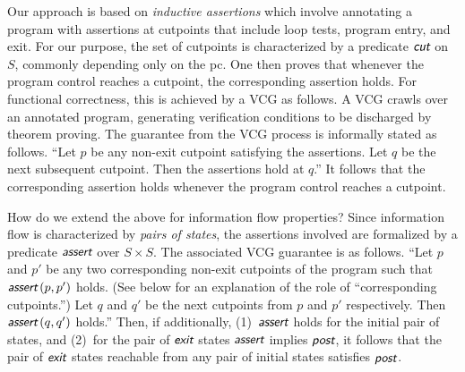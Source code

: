 \documentclass[conference]{IEEEtran}
\newcommand{\func}[1]{\ensuremath{\mbox{{\sf {\em #1}}}}}
\begin{document}
Our approach is based on {\em inductive assertions} which involve
annotating a program with assertions at cutpoints that include loop
tests, program entry, and exit.  For our purpose, the set of cutpoints
is characterized by a predicate \func{cut} on $S$, commonly depending
only on the pc.  One then proves that whenever the program control
reaches a cutpoint, the corresponding assertion holds.  For functional
correctness, this is achieved by a VCG as follows.  A VCG crawls over
an annotated program, generating verification conditions to be
discharged by theorem proving.  The guarantee from the VCG process is
informally stated as follows.  ``Let $p$ be any non-exit cutpoint
satisfying the assertions.  Let $q$ be the next subsequent cutpoint.
Then the assertions hold at $q$.''  It follows that the corresponding
assertion holds whenever the program control reaches a cutpoint.

How do we extend the above for information flow properties?  Since
information flow is characterized by {\em pairs of states}, the
assertions involved are formalized by a predicate $\func{assert}$ over
$S\times S$.  The associated VCG guarantee is as follows.  ``Let $p$
and $p'$ be any two corresponding non-exit cutpoints of the program
such that $\func{assert}\,(p,p')$ holds.  (See below for an
explanation of the role of ``corresponding cutpoints.'')  Let $q$ and
$q'$ be the next cutpoints from $p$ and $p'$ respectively.  Then
$\func{assert}\,(q,q')$ holds.''  Then, if additionally,
(1)~\func{assert} holds for the initial pair of states, and (2)~for
the pair of \func{exit} states \func{assert} implies \func{post}, it
follows that the pair of \func{exit} states reachable from any pair of
initial states satisfies \func{post}.
\end{document}
